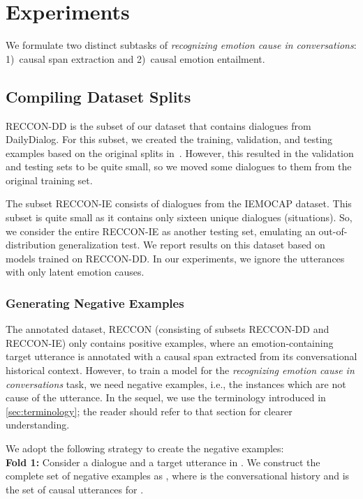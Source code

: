 \documentclass[11pt,a4paper]{article}
\theoremstyle{definition}
\newcommand\RECCON{\emph{recognizing emotion cause in conversations}}
\newcommand\RECCONDA{RECCON}
\newcommand\RECCONDADD{RECCON-DD}
\newcommand\RECCONDAIE{RECCON-IE}
\begin{document}
\section{Experiments}
\label{sec:experiments}

We formulate two distinct subtasks of \RECCON{}: 1)~causal span extraction and 2)~causal emotion entailment. 


\subsection{Compiling Dataset Splits}
\label{sec:dataprep}

\RECCONDADD{} is the subset of our dataset that contains dialogues from DailyDialog. For this subset, we created the training, validation, and testing examples based on the original splits in~\cite{li2017dailydialog}. However, this resulted in the validation and testing sets to be quite small, so we moved some dialogues to them from the original training set. 

The subset \RECCONDAIE{} consists of dialogues from the IEMOCAP dataset. This subset is quite small as it contains only sixteen unique dialogues (situations). So, we consider the entire \RECCONDAIE{}  as another testing set, emulating an out-of-distribution generalization test. We report results on this dataset based on models trained on \RECCONDADD{}. In our experiments, we ignore the utterances with only latent emotion causes. 

\subsubsection{Generating Negative Examples}
\label{sec:neg}
The annotated dataset, \RECCONDA{} (consisting of subsets \RECCONDADD{} and \RECCONDAIE{}) only contains positive examples, where an emotion-containing target utterance is annotated with a causal span extracted from its conversational historical context. However, to train a model for the \RECCON{} task, we need negative examples, i.e., the instances which are not cause of the utterance. In the sequel, we use the terminology introduced in \cref{sec:terminology}; the reader should 
refer to that section for clearer understanding.

We adopt the following strategy to create the negative examples:\\
\noindent \textbf{Fold 1:} Consider a dialogue  and a target utterance  in .
We construct the complete set of negative examples as 
,
where  is the conversational history and  is the set of causal utterances for .
\end{document}
